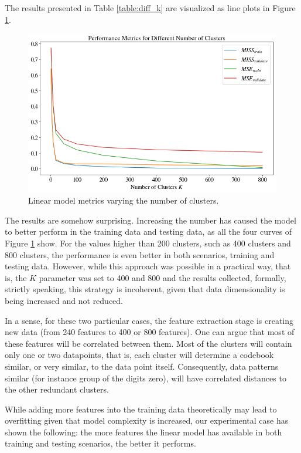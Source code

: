 \documentclass{article}
\begin{document}
The results presented in Table \ref{table:diff_k} are visualized as line plots in Figure \ref{fig:diff_k}.

\begin{figure}[h!]
    \centering
    \includegraphics[scale=0.42]{images/cv_metrics.png}
    \caption{Linear model metrics varying the number of clusters.}
    \label{fig:diff_k}
\end{figure}

The results are somehow surprising. Increasing the number has caused the model to better perform in the training data and testing data, as all the four curves of Figure \ref{fig:diff_k} show. For the values higher than 200 clusters, such as 400 clusters and  800 clusters, the performance is even better in both scenarios, training and testing data. However, while this approach was possible in a practical way, that is, the $K$ parameter was set to 400 and 800 and the results collected, formally, strictly speaking, this strategy is incoherent, given that data dimensionality is being increased and not reduced.

In a sense, for these two particular cases, the feature extraction stage is creating new data (from 240 features to 400 or 800 features). One can argue that most of these features will be correlated between them. Most of the clusters will contain only one or two datapoints, that is, each cluster will determine a codebook similar, or very similar, to the data point itself. Consequently, data patterns similar (for instance group of the digits zero), will have correlated distances to the other redundant clusters. 

While adding more features into the training data theoretically may lead to overfitting given that model complexity is increased, our experimental case has shown the following: the more features the linear model has available in both training and testing scenarios, the better it performs.
\end{document}

